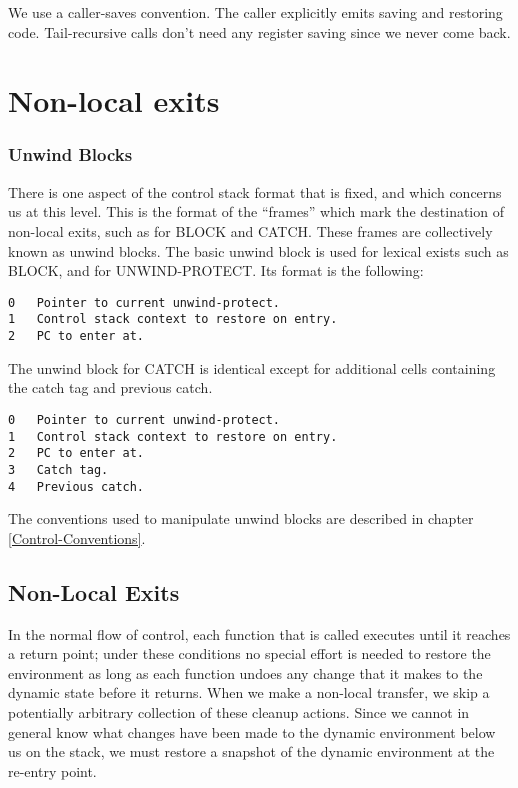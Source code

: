 {\begin{itemize, spread 0, spacing 1}
We use a caller-saves convention.  The caller explicitly emits saving and
restoring code.  Tail-recursive calls don't need
any register saving since we never come back.



\chapter{Non-local exits}


\subsection{Unwind Blocks}

There is one aspect of the control stack format that is fixed, and which
concerns us at this level.  This is the format of the ``frames'' which mark the
destination of non-local exits, such as for BLOCK and CATCH.  These frames are
collectively known as unwind blocks.  The basic unwind block is used for
lexical exists such as BLOCK, and for UNWIND-PROTECT.  Its format is the
following:
\begin{verbatim}
0   Pointer to current unwind-protect.
1   Control stack context to restore on entry.
2   PC to enter at.
\end{verbatim}

The unwind block for CATCH is identical except for additional cells
containing the catch tag and previous catch.
\begin{verbatim}
0   Pointer to current unwind-protect.
1   Control stack context to restore on entry.
2   PC to enter at.
3   Catch tag.
4   Previous catch.
\end{verbatim}

The conventions used to manipulate unwind blocks are described in chapter
\ref{Control-Conventions}.



\section{Non-Local Exits}
\label{Catch}

In the normal flow of control, each function that is called executes until it
reaches a return point; under these conditions no special effort is needed to
restore the environment as long as each function undoes any change that it
makes to the dynamic state before it returns.  When we make a non-local
transfer, we skip a potentially arbitrary collection of these cleanup actions.
Since we cannot in general know what changes have been made to the dynamic
environment below us on the stack, we must restore a snapshot of the dynamic
environment at the re-entry point.


\end{itemize, spread 0, spacing 1}}
